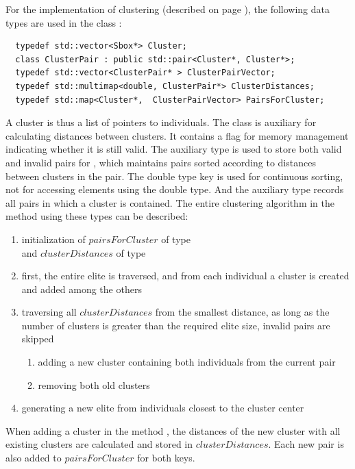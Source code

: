 For the implementation of clustering (described on page \pageref{secClustering}), the following
data types are used in the class :
\begin{verbatim}
  typedef std::vector<Sbox*> Cluster;
  class ClusterPair : public std::pair<Cluster*, Cluster*>;
  typedef std::vector<ClusterPair* > ClusterPairVector;
  typedef std::multimap<double, ClusterPair*> ClusterDistances;
  typedef std::map<Cluster*,  ClusterPairVector> PairsForCluster;
\end{verbatim}
A cluster is thus a list of pointers to individuals. The class 
is auxiliary for calculating distances between clusters. It contains a flag
for memory management indicating whether it is still valid. The auxiliary type  is used
to store both valid and invalid pairs for ,
which maintains pairs sorted according to distances between clusters in the pair.
The double type key is used for continuous sorting, not for accessing elements using the double type.
And the auxiliary type  records all pairs in which a cluster
is contained. The entire clustering algorithm in the method  using these
types can be described:
\begin{enumerate}
  \item initialization of $pairsForCluster$ of type  \\ and
   $clusterDistances$ of type 
  \item first, the entire elite is traversed, and from each individual a cluster is created
   and added among the others
  \item traversing all $clusterDistances$ from the smallest distance, as long as the number
  of clusters is greater than the required elite size, invalid pairs are skipped
  \begin{enumerate}
    \item adding a new cluster containing both individuals from the current pair
    \item removing both old clusters
  \end{enumerate}
  \item generating a new elite from individuals closest to the cluster center
\end{enumerate}

When adding a cluster in the method ,
the distances of the new cluster with all existing clusters are calculated and
stored in $clusterDistances$.
Each new pair is also added to $pairsForCluster$ for both keys.

